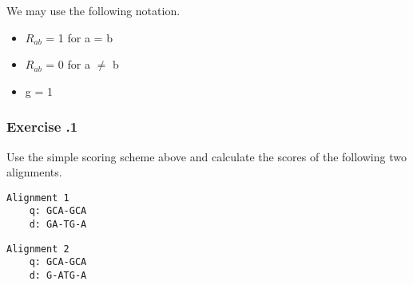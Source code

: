\noindent
We may use the following notation.
\begin{itemize}
\item $R_{ab}$ = 1 for a = b
\item $R_{ab}$ = 0 for a $\neq$ b
\item g = 1
\end{itemize}

%
%
\newpage 

%
%
\subsubsection*{Exercise \thesection.1}
Use the simple scoring scheme above and calculate the scores of the following two alignments.

\begin{multicols}{2}
\begin{verbatim}
Alignment 1
    q: GCA-GCA
    d: GA-TG-A	
\end{verbatim}

\begin{verbatim}
Alignment 2 
    q: GCA-GCA
	d: G-ATG-A
\end{verbatim}
\end{multicols}

%
